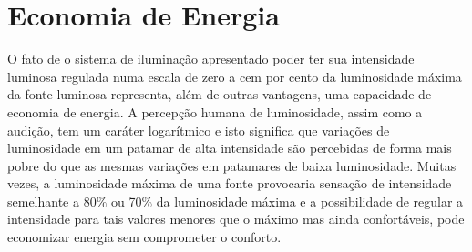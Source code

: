 \section{Economia de Energia}

O fato de o sistema de iluminação apresentado poder ter sua intensidade luminosa regulada numa escala de zero a cem por cento da luminosidade máxima da fonte luminosa representa, além de outras vantagens, uma capacidade de economia de energia. A percepção humana de luminosidade, assim como a audição, tem um caráter logarítmico e isto significa que variações de luminosidade em um patamar de alta intensidade são percebidas de forma mais pobre do que as mesmas variações em patamares de baixa luminosidade. Muitas vezes, a luminosidade máxima de uma fonte provocaria sensação de intensidade semelhante a 80$\%$ ou 70$\%$ da luminosidade máxima e a possibilidade de regular a intensidade para tais valores menores que o máximo mas ainda confortáveis, pode economizar energia sem comprometer o conforto.

